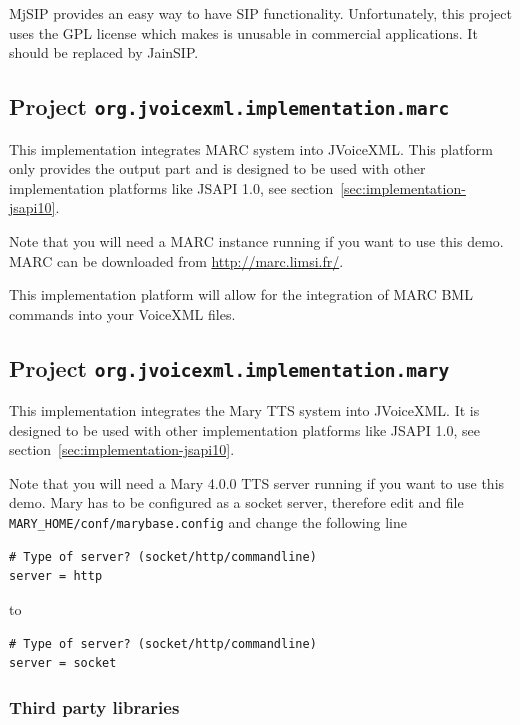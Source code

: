 \documentclass[11pt,a4paper]{article}
\begin{document}
MjSIP provides an easy way to have SIP functionality. Unfortunately, this
project uses the GPL license which makes is unusable in commercial
applications. It should be replaced by JainSIP.

\subsection{Project \texttt{org.jvoicexml.implementation.marc}}

This implementation integrates MARC system into JVoiceXML. This platform
only provides the output part and is designed to be used with other
implementation platforms like JSAPI 1.0, see section~\ref{sec:implementation-jsapi10}.

Note that you will need a MARC instance running if you want to use this
demo. MARC can be downloaded from \url{http://marc.limsi.fr/}.

This implementation platform will allow for the integration of MARC BML commands
into your VoiceXML files.

\subsection{Project \texttt{org.jvoicexml.implementation.mary}}

This implementation integrates the Mary TTS system into JVoiceXML. It is
designed to be used with other implementation platforms like JSAPI 1.0, see
section~\ref{sec:implementation-jsapi10}.

Note that you will need a Mary 4.0.0  TTS server running if you want to use this
demo. Mary has to be configured as a socket server, therefore edit and file
\texttt{MARY\_HOME/conf/marybase.config} and change the following line 

\begin{lstlisting}
# Type of server? (socket/http/commandline)
server = http
\end{lstlisting}

to

\begin{lstlisting}
# Type of server? (socket/http/commandline)
server = socket
\end{lstlisting}

\subsubsection{Third party libraries}
\label{sec:mary-third-party-libr}
\end{document}
